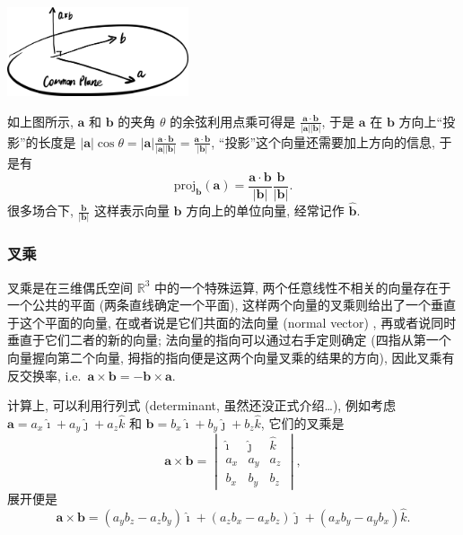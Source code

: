   \begin{tcolorbox}[size=fbox, breakable, enhanced jigsaw]
    \includegraphics[width=0.4\textwidth]{img/image-20240104090927918.png}
  \end{tcolorbox}

如上图所示, \(\boldsymbol{a}\) 和 \(\boldsymbol{b}\) 的夹角 \(\theta\)
的余弦利用点乘可得是
\(\frac{\boldsymbol{a}\cdot\boldsymbol{b}}{|\boldsymbol{a}||\boldsymbol{b}|}\),
于是 \(\boldsymbol{a}\) 在 \(\boldsymbol{b}\) 方向上``投影''的长度是
\(|\boldsymbol{a}|\cos\theta=|\boldsymbol{a}|\frac{\boldsymbol{a}\cdot\boldsymbol{b}}{|\boldsymbol{a}||\boldsymbol{b}|}=\frac{\boldsymbol{a}\cdot\boldsymbol{b}}{|\boldsymbol{b}|}\),
``投影''这个向量还需要加上方向的信息, 于是有
\[
\mathrm{proj}_{\boldsymbol{b}}(\boldsymbol{a})=\frac{\boldsymbol{a}\cdot\boldsymbol{b}}{|\boldsymbol{b}|}\frac{\boldsymbol{b}}{|\boldsymbol{b}|}.
\]
很多场合下, \(\frac{\boldsymbol{b}}{|\boldsymbol{b}|}\) 这样表示向量
\(\boldsymbol{b}\) 方向上的单位向量, 经常记作 \(\hat{\boldsymbol{b}}\).


\subsubsection{叉乘}
叉乘是在三维偶氏空间 \(\mathbb{R}^3\) 中的一个特殊运算,
两个任意线性不相关的向量存在于一个公共的平面 (两条直线确定一个平面),
这样两个向量的叉乘则给出了一个垂直于这个平面的向量,
在或者说是它们共面的法向量 (normal vector) ,
再或者说同时垂直于它们二者的新的向量; 法向量的指向可以通过右手定则确定
(四指从第一个向量握向第二个向量,
拇指的指向便是这两个向量叉乘的结果的方向), 因此叉乘有反交换率,
i.e.~\(\boldsymbol{a}\times\boldsymbol{b}=-\boldsymbol{b}\times\boldsymbol{a}\).

计算上, 可以利用行列式 (determinant, 虽然还没正式介绍\ldots),
例如考虑\(\boldsymbol{a}=a_x\hat{\imath}+a_y\hat{\jmath}+a_z\hat{k}\) 和
\(\boldsymbol{b}=b_x\hat{\imath}+b_y\hat{\jmath}+b_z\hat{k}\),
它们的叉乘是 \[
\boldsymbol{a}\times\boldsymbol{b}=\begin{vmatrix}\hat{\imath}&\hat{\jmath}&\hat{k}\\a_x&a_y&a_z\\b_x&b_y&b_z\end{vmatrix},
\] 展开便是 \[
\boldsymbol{a}\times\boldsymbol{b}=(a_yb_z-a_zb_y)\hat{\imath}+(a_zb_x-a_xb_z)\hat{\jmath}+(a_xb_y-a_yb_x)\hat{k}.
\]

